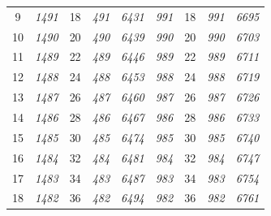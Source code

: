 \documentclass[10pt,fleqn]{article}
\begin{document}
\begin{longtable}{c|cccccccc}
9 & {\color{blue} \it 1491 \rm} & {\color{black} 18} & {\color{blue} \it 491 \rm} & {\color{blue} \it 6431 \rm} & {\color{blue} \it 991 \rm} & {\color{black} 18} & {\color{blue} \it 991 \rm} & {\color{blue} \it 6695 \rm} \\
10 & {\color{blue} \it 1490 \rm} & {\color{black} 20} & {\color{blue} \it 490 \rm} & {\color{blue} \it 6439 \rm} & {\color{blue} \it 990 \rm} & {\color{black} 20} & {\color{blue} \it 990 \rm} & {\color{blue} \it 6703 \rm} \\
11 & {\color{blue} \it 1489 \rm} & {\color{black} 22} & {\color{blue} \it 489 \rm} & {\color{blue} \it 6446 \rm} & {\color{blue} \it 989 \rm} & {\color{black} 22} & {\color{blue} \it 989 \rm} & {\color{blue} \it 6711 \rm} \\
12 & {\color{blue} \it 1488 \rm} & {\color{black} 24} & {\color{blue} \it 488 \rm} & {\color{blue} \it 6453 \rm} & {\color{blue} \it 988 \rm} & {\color{black} 24} & {\color{blue} \it 988 \rm} & {\color{blue} \it 6719 \rm} \\
13 & {\color{blue} \it 1487 \rm} & {\color{black} 26} & {\color{blue} \it 487 \rm} & {\color{blue} \it 6460 \rm} & {\color{blue} \it 987 \rm} & {\color{black} 26} & {\color{blue} \it 987 \rm} & {\color{blue} \it 6726 \rm} \\
14 & {\color{blue} \it 1486 \rm} & {\color{black} 28} & {\color{blue} \it 486 \rm} & {\color{blue} \it 6467 \rm} & {\color{blue} \it 986 \rm} & {\color{black} 28} & {\color{blue} \it 986 \rm} & {\color{blue} \it 6733 \rm} \\
15 & {\color{blue} \it 1485 \rm} & {\color{black} 30} & {\color{blue} \it 485 \rm} & {\color{blue} \it 6474 \rm} & {\color{blue} \it 985 \rm} & {\color{black} 30} & {\color{blue} \it 985 \rm} & {\color{blue} \it 6740 \rm} \\
16 & {\color{blue} \it 1484 \rm} & {\color{black} 32} & {\color{blue} \it 484 \rm} & {\color{blue} \it 6481 \rm} & {\color{blue} \it 984 \rm} & {\color{black} 32} & {\color{blue} \it 984 \rm} & {\color{blue} \it 6747 \rm} \\
17 & {\color{blue} \it 1483 \rm} & {\color{black} 34} & {\color{blue} \it 483 \rm} & {\color{blue} \it 6487 \rm} & {\color{blue} \it 983 \rm} & {\color{black} 34} & {\color{blue} \it 983 \rm} & {\color{blue} \it 6754 \rm} \\
18 & {\color{blue} \it 1482 \rm} & {\color{black} 36} & {\color{blue} \it 482 \rm} & {\color{blue} \it 6494 \rm} & {\color{blue} \it 982 \rm} & {\color{black} 36} & {\color{blue} \it 982 \rm} & {\color{blue} \it 6761 \rm} \\

\end{longtable}
\end{document}
